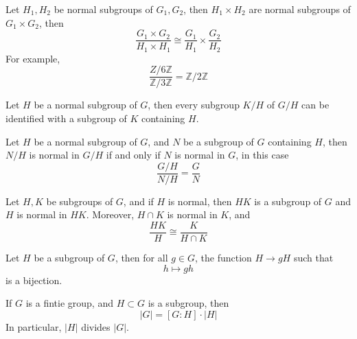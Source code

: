 \documentclass[openany]{book}
\newcommand{\Z}{\mathbb{Z}}
\begin{document}
\begin{prop}
    Let $H_1,H_2$ be normal subgroups of $G_1,G_2$, then $H_1\times H_2$ are normal subgroups of $G_1\times G_2$, then 
    \begin{equation*}
        \frac{G_1\times G_2}{H_1\times H_1}\cong\frac{G_1}{H_1}\times\frac{G_2}{H_2}
    \end{equation*}
    For example, 
    \begin{equation*}
        \frac{Z/6\Z}{\Z/3\Z}=\Z/2\Z
    \end{equation*}
\end{prop}

\begin{prop}
    Let $H$ be a normal subgroup of $G$, then every subgroup $K/H$ of $G/H$ can be identified with a subgroup of $K$ containing $H$.
\end{prop}


\begin{prop}
    Let $H$ be a normal subgroup of $G$, and $N$ be a subgroup of $G$ containing $H$, then $N/H$ is normal in $G/H$ if and only if $N$ is normal in $G$, in this case
    \begin{equation*}
        \frac{G/H}{N/H}=\frac{G}{N}
    \end{equation*}
\end{prop}



\begin{prop}
    Let $H,K$ be subgroups of $G$, and if $H$ is normal, then $HK$ is a subgroup of $G$ and $H$ is normal in $HK$. Moreover, $H\cap K$ is normal in $K$, and 
    \begin{equation*}
        \frac{HK}{H}\cong\frac{K}{H\cap K}
    \end{equation*}
\end{prop}


\begin{prop}
    Let $H$ be a subgroup of $G$, then for all $g\in G$, the function $H\to gH$ such that
    \begin{equation*}
       h\mapsto gh
    \end{equation*}
    is a bijection.
\end{prop}

\begin{thm}[Lagrange]
    If $G$ is a fintie group, and $H\subset G$ is a subgroup, then 
    \begin{equation*}
        |G|=[G:H]\cdot|H|
    \end{equation*}
    In particular, $|H|$ divides $|G|$.
\end{thm}
\end{document}
